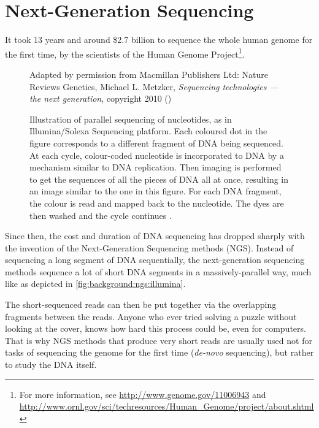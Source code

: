\documentclass[parskip]{cs4rep}
\begin{document}
\section{Next-Generation Sequencing}

It took 13 years and around \$2.7 billion to sequence the whole human genome for the first time, by the scientists of the Human Genome Project\footnote{For more information, see \url{http://www.genome.gov/11006943} and
    \url{http://www.ornl.gov/sci/techresources/Human_Genome/project/about.shtml}}. 
    
    
\begin{figure}
    \centering
    {Adapted by permission from Macmillan Publishers Ltd: Nature Reviews Genetics,
     Michael L. Metzker, \emph{Sequencing technologies — the next generation}, copyright 2010 (\cite{Metzker:j6NWuwFp})}
    \caption{Illustration of parallel sequencing of nucleotides, as in Illumina/Solexa Sequencing platform.
    Each coloured dot in the figure corresponds to a different fragment of DNA being sequenced. 
    At each cycle, colour-coded nucleotide is incorporated to DNA by a mechanism similar to DNA replication. Then imaging is performed to get the sequences of all the pieces of DNA all at once, resulting in an image similar to the one in this figure. For each DNA fragment, the colour is read and mapped back to the nucleotide. The dyes are then washed and the cycle continues \cite{Metzker:j6NWuwFp}.}
    \label{fig:background:ngs:illumina}
\end{figure}

Since then, the cost and duration of DNA sequencing has dropped sharply with the invention of
the Next-Generation Sequencing methods (NGS). Instead of sequencing a long segment of DNA sequentially,
the next-generation sequencing methods sequence a lot of short DNA segments in a massively-parallel way, much like as depicted in \autoref{fig:background:ngs:illumina}.

The short-sequenced reads can then be put together via the overlapping fragments between the reads. Anyone who ever tried solving a puzzle without looking at the cover, knows how hard this process could be, even for computers. That is why NGS methods that produce very short reads are usually used not for tasks of sequencing the genome for the first time (\emph{de-novo} sequencing), but
rather to study the DNA itself.
\end{document}
